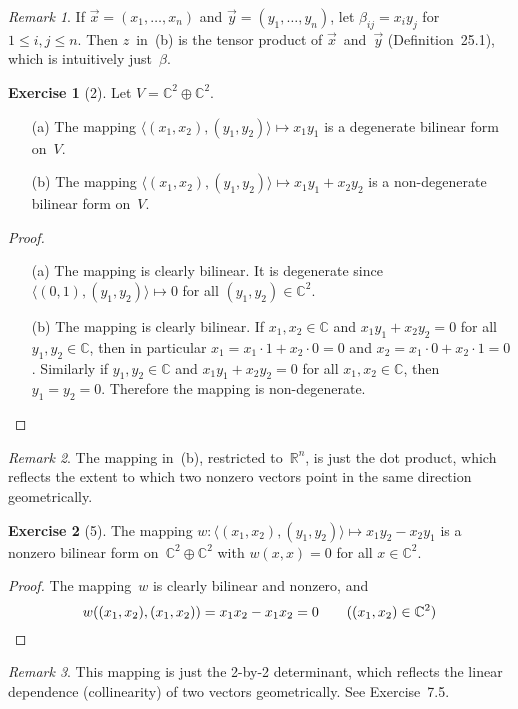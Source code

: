 \documentclass[letterpaper,12pt]{article}
\newcommand{\R}{\mathbb{R}}
\newcommand{\C}{\mathbb{C}}
\newcommand{\dsum}{\oplus}
\newcommand{\pair}[2]{\langle{#1},{#2}\rangle}
\theoremstyle{definition}
\newtheorem*{exer}{Exercise}
\theoremstyle{remark}
\newtheorem*{rmk}{Remark}
\theoremstyle{direction}
\begin{document}
\begin{rmk}
If \(\vec{x}=(x_1,\ldots,x_n)\) and \(\vec{y}=(y_1,\ldots,y_n)\), let \(\beta_{ij}=x_iy_j\) for \(1\le i,j\le n\). Then \(z\)~in~(b) is the tensor product of \(\vec{x}\)~and~\(\vec{y}\) (Definition~25.1), which is intuitively just~\(\beta\).
\end{rmk}

\begin{exer}[2]
Let \(V=\C^2\dsum\C^2\).
\begin{enumerate}
\item[(a)] The mapping \(\pair{(x_1,x_2)}{(y_1,y_2)}\mapsto x_1y_1\) is a degenerate bilinear form on~\(V\).
\item[(b)] The mapping \(\pair{(x_1,x_2)}{(y_1,y_2)}\mapsto x_1y_1+x_2y_2\) is a non-degenerate bilinear form on~\(V\).
\end{enumerate}
\end{exer}
\begin{proof}\
\begin{enumerate}
\item[(a)] The mapping is clearly bilinear. It is degenerate since \(\pair{(0,1)}{(y_1,y_2)}\mapsto 0\) for all \((y_1,y_2)\in\C^2\).
\item[(b)] The mapping is clearly bilinear. If \(x_1,x_2\in\C\) and \(x_1y_1+x_2y_2=0\) for all \(y_1,y_2\in\C\), then in particular \(x_1=x_1\cdot1+x_2\cdot0=0\) and \(x_2=x_1\cdot0+x_2\cdot1=0\). Similarly if \(y_1,y_2\in\C\) and \(x_1y_1+x_2y_2=0\) for all \(x_1,x_2\in\C\), then \(y_1=y_2=0\). Therefore the mapping is non-degenerate.\qedhere
\end{enumerate}
\end{proof}
\begin{rmk}
The mapping in~(b), restricted to~\(\R^n\), is just the dot product, which reflects the extent to which two nonzero vectors point in the same direction geometrically.
\end{rmk}

\begin{exer}[5]
The mapping \(w:\pair{(x_1,x_2)}{(y_1,y_2)}\mapsto x_1y_2-x_2y_1\) is a nonzero bilinear form on~\(\C^2\dsum\C^2\) with \(w(x,x)=0\) for all \(x\in\C^2\).
\end{exer}
\begin{proof}
The mapping~\(w\) is clearly bilinear and nonzero, and
\[w((x_1,x_2),(x_1,x_2))=x_1x_2-x_1x_2=0\qquad((x_1,x_2)\in\C^2)\qedhere\]
\end{proof}
\begin{rmk}
This mapping is just the 2-by-2 determinant, which reflects the linear dependence (collinearity) of two vectors geometrically. See Exercise~7.5.
\end{rmk}
\end{document}
